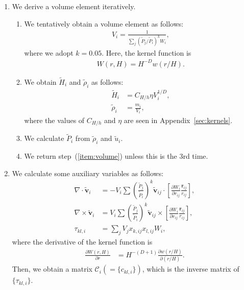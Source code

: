 \documentclass[fleqn,dvipdfmx]{article}
\begin{document}
\begin{enumerate}
\item We derive a volume element iteratively.

  \begin{enumerate}
  \item \label{item:volume} We tentatively obtain a volume element as
    follows:
    \begin{align}
      V_i = \frac{1}{\sum_j (\tilde{P}_j/\tilde{P}_i)^k W_i},
    \end{align}
    where we adopt $k=0.05$. Here, the kernel function is
    \begin{align}
      W(r,H) = H^{-D} w(r/H).
    \end{align}

  \item We obtain $\tilde{H}_i$ and $\tilde{\rho}_i$ as follows:
    \begin{align}
      \tilde{H}_i    &= C_{H/h} \eta V_i^{1/D}, \\
      \tilde{\rho}_i &= \frac{m_i}{V_i},
    \end{align}
    where the values of $C_{H/h}$ and $\eta$ are seen in
    Appendix~\ref{sec:kernels}.

  \item We calculate $\tilde{P}_i$ from $\tilde{\rho}_i$ and
    $\tilde{u}_i$.

  \item We return step~(\ref{item:volume}) unless this is the 3rd
    time.

  \end{enumerate}

\item We calculate some auxiliary variables as follows:
  \begin{align}
    \nabla \cdot \tilde{\bm{v}}_i &= - V_i \sum \left(
    \frac{\tilde{P}_j}{\tilde{P}_i} \right)^k \tilde{\bm{v}}_{ij}
    \cdot \left[\frac{\partial W_i}{\partial r_{ij}}
      \frac{\bm{r}_{ij}}{r_{ij}} \right], \\
    \nabla \times \tilde{\bm{v}}_i &= V_i \sum \left(
    \frac{\tilde{P}_j}{\tilde{P}_i} \right)^k \tilde{\bm{v}}_{ij}
    \times \left[\frac{\partial W_i}{\partial r_{ij}}
      \frac{\bm{r}_{ij}}{r_{ij}} \right], \\
    \tau_{kl,i} &= \sum_j V_j x_{k,ij} x_{l,ij} W_i,
  \end{align}
  where the derivative of the kernel function is
  \begin{align}
    \frac{\partial W(r,H)}{\partial r} &= H^{-(D+1)} \frac{\partial
      w(r/H)}{\partial (r/H)}.
  \end{align}
  Then, we obtain a matrix $\mathcal{C}_i (=\{c_{kl,i}\})$, which is
  the inverse matrix of $\{\tau_{kl,i}\}$.


\end{enumerate}
\end{document}
